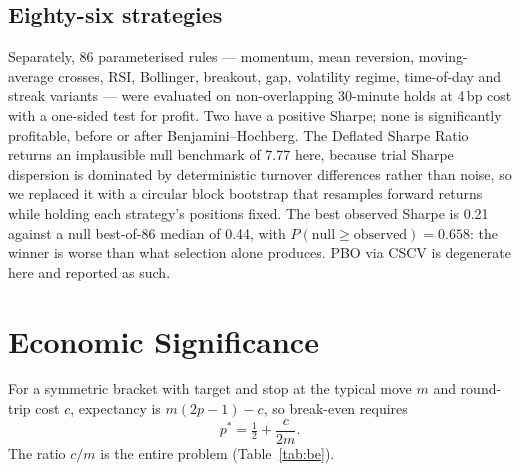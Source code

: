 \documentclass[conference]{IEEEtran}
\begin{document}
\subsection{Eighty-six strategies}

Separately, 86 parameterised rules --- momentum, mean reversion, moving-average
crosses, RSI, Bollinger, breakout, gap, volatility regime, time-of-day and
streak variants --- were evaluated on non-overlapping 30-minute holds at 4\,bp
cost with a one-sided test for profit. Two have a positive Sharpe; none is
significantly profitable, before or after Benjamini--Hochberg. The Deflated
Sharpe Ratio returns an implausible null benchmark of 7.77 here, because trial
Sharpe dispersion is dominated by deterministic turnover differences rather than
noise, so we replaced it with a circular block bootstrap \cite{politis1992} that
resamples forward returns while holding each strategy's positions fixed. The
best observed Sharpe is 0.21 against a null best-of-86 median of 0.44, with
$P(\text{null} \geq \text{observed}) = 0.658$: the winner is worse than what
selection alone produces. PBO via CSCV \cite{bailey2017} is degenerate here and
reported as such.

\section{Economic Significance}
\label{sec:econ}

For a symmetric bracket with target and stop at the typical move $m$ and
round-trip cost $c$, expectancy is $m(2p-1) - c$, so break-even requires
\begin{equation}
p^{\ast} = \tfrac{1}{2} + \frac{c}{2m}.
\label{eq:be}
\end{equation}
The ratio $c/m$ is the entire problem (Table~\ref{tab:be}).
\end{document}
